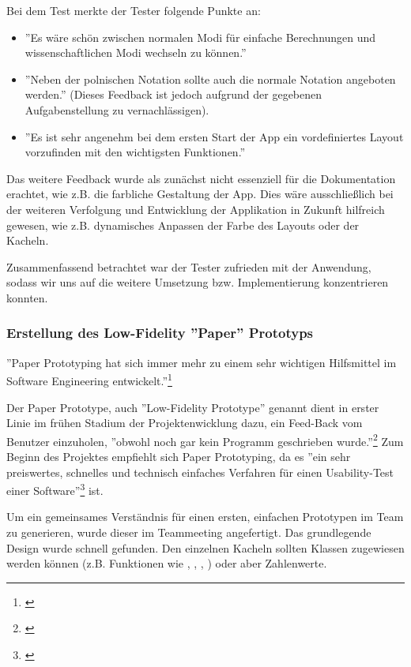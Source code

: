 Bei dem Test merkte der Tester folgende Punkte an:
\begin{itemize}
	\item ''Es wäre schön zwischen normalen Modi für einfache Berechnungen und wissenschaftlichen Modi wechseln zu können.''
	\item ''Neben der polnischen Notation sollte auch die normale Notation angeboten werden.'' (Dieses Feedback ist jedoch aufgrund der gegebenen Aufgabenstellung zu vernachlässigen).
	\item ''Es ist sehr angenehm bei dem ersten Start der App ein vordefiniertes Layout vorzufinden mit den wichtigsten Funktionen.''
\end{itemize}

Das weitere Feedback wurde als zunächst nicht essenziell für die Dokumentation erachtet, wie z.B. die farbliche Gestaltung der App. Dies wäre ausschließlich bei der weiteren Verfolgung und Entwicklung der Applikation in Zukunft hilfreich gewesen, wie z.B. dynamisches Anpassen der Farbe des Layouts oder der Kacheln. 

Zusammenfassend betrachtet war der Tester zufrieden mit der Anwendung, sodass wir uns auf die weitere Umsetzung bzw. Implementierung konzentrieren konnten. 

\subsubsection{Erstellung des Low-Fidelity ''Paper'' Prototyps}
\label{subsubsection:erstellung-low-fidelity-paper}

''Paper Prototyping hat sich immer mehr zu einem sehr wichtigen Hilfsmittel im Software Engineering entwickelt.''\footnote{\cite[][]{paperPrototypeGentgesxy2002a}}

Der Paper Prototype, auch ''Low-Fidelity Prototype'' genannt dient in erster Linie im frühen Stadium der Projektenwicklung dazu, ein Feed-Back vom Benutzer einzuholen, ''obwohl noch gar kein Programm geschrieben wurde.''\footnote{\cite[][]{paperPrototypeGentgesxy2002a}}  Zum Beginn des Projektes empfiehlt sich Paper Prototyping, da es ''ein sehr preiswertes, schnelles und technisch einfaches Verfahren für einen Usability-Test einer Software''\footnote{\cite[][]{paperPrototypeGentgesxy2002a}} ist.

Um ein gemeinsames Verständnis für einen ersten, einfachen Prototypen im Team zu generieren, wurde dieser im Teammeeting angefertigt. Das grundlegende Design wurde schnell gefunden. Den einzelnen Kacheln sollten Klassen zugewiesen werden können (z.B. Funktionen wie , ,  , ) oder aber Zahlenwerte. 

